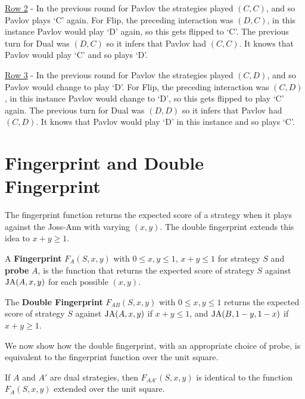 \underline{Row 2} - In the previous round for Pavlov the strategies played $(C, C)$, and so Pavlov plays `C' again.
For Flip, the preceding interaction was $(D, C)$, in this instance Pavlov would play `D' again, so this gets flipped to `C'.
The previous turn for Dual was $(D, C)$ so it infers that Pavlov had $(C, C)$.
It knows that Pavlov would play `C' and so plays `D'.

\underline{Row 3} - In the previous round for Pavlov the strategies played $(C, D)$, and so Pavlov would change to play `D'.
For Flip, the preceding interaction was $(C, D)$, in this instance Pavlov would change to `D', so this gets flipped to play `C' again.
The previous turn for Dual was $(D, D)$ so it infers that Pavlov had $(C, D)$.
It knows that Pavlov would play `D' in this instance and so plays `C'.

\section{Fingerprint and Double Fingerprint}
The fingerprint function returns the expected score of a strategy when it plays against the Joss-Ann with varying $(x, y)$.
The double fingerprint extends this idea to $x+y \geq 1$.

\begin{definition}\label{def:fingerprint}
A \textbf{Fingerprint} $F_A(S, x, y)$ with $0 \leq x, y \leq 1$, $x+y \leq 1$ for strategy $S$ and \textbf{probe} $A$, is the function that returns the expected score of strategy $S$ against $\text{JA}(A, x, y)$ for each possible $(x, y)$.
\end{definition}


\begin{definition}\label{def:double-fingerprint}
The \textbf{Double Fingerprint} $F_{AB}(S, x, y)$ with $0 \leq x, y \leq 1$ returns the expected score of strategy $S$ against $\text{JA}(A, x, y)$ if $x+y \leq 1$, and $\text{JA}(B, 1-y, 1-x)$ if $x+y \geq 1$.
\end{definition}

We now show how the double fingerprint, with an appropriate choice of probe, is equivalent to the fingerprint function over the unit square.

\begin{theorem}\label{thm:fingerprint-unit-square}
If $A$ and $A'$ are dual strategies, then $F_{AA'}(S, x, y)$ is identical to the function $F_A(S, x, y)$ extended over the unit square.
\end{theorem}

